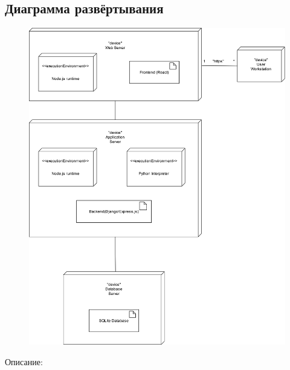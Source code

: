 \documentclass[a4paper]{report}
\begin{document}
\subsection{Диаграмма развёртывания}
\begin{figure}[H]
    \centering
    \includegraphics[height=0.8\textheight]{Диаграмма развёртывания.png}
\end{figure}
Описание:
\end{document}

